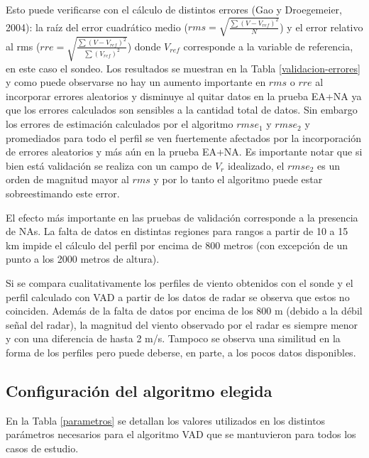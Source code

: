 \documentclass[12pt,spanish,oneside, a4paper]{book}
\begin{document}
\newpage

Esto puede verificarse con el cálculo de distintos errores (Gao y
Droegemeier, 2004): la raíz del error cuadrático medio
(\(rms = \sqrt{ \frac{\sum (V-V_{ref})^2}{N} }\)) y el error relativo al
rms (\(rre = \sqrt{ \frac{\sum (V-V_{ref})^2}{\sum (V_{ref})^2} }\))
donde \(V_{ref}\) corresponde a la variable de referencia, en este caso
el sondeo. Los resultados se muestran en la Tabla
\ref{validacion-errores} y como puede observarse no hay un aumento
importante en \(rms\) o \(rre\) al incorporar errores aleatorios y
disminuye al quitar datos en la prueba EA+NA ya que los errores
calculados son sensibles a la cantidad total de datos. Sin embargo los
errores de estimación calculados por el algoritmo \(rmse_1\) y
\(rmse_2\) y promediados para todo el perfil se ven fuertemente
afectados por la incorporación de errores aleatorios y más aún en la
prueba EA+NA. Es importante notar que si bien está validación se realiza
con un campo de \(V_r\) idealizado, el \(rmse_2\) es un orden de
magnitud mayor al \(rms\) y por lo tanto el algoritmo puede estar
sobreestimando este error.

El efecto más importante en las pruebas de validación corresponde a la
presencia de NAs. La falta de datos en distintas regiones para rangos a
partir de 10 a 15 km impide el cálculo del perfil por encima de 800
metros (con excepción de un punto a los 2000 metros de altura).

Si se compara cualitativamente los perfiles de viento obtenidos con el
sonde y el perfil calculado con VAD a partir de los datos de radar se
observa que estos no coinciden. Además de la falta de datos por encima
de los 800 m (debido a la débil señal del radar), la magnitud del viento
observado por el radar es siempre menor y con una diferencia de hasta 2
m/s. Tampoco se observa una similitud en la forma de los perfiles pero
puede deberse, en parte, a los pocos datos disponibles.

\subsection{Configuración del algoritmo
elegida}\label{configuracion-del-algoritmo-elegida}

En la Tabla \ref{parametros} se detallan los valores utilizados en los
distintos parámetros necesarios para el algoritmo VAD que se mantuvieron
para todos los casos de estudio.
\end{document}
